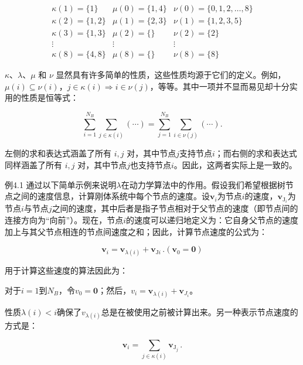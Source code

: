 \documentclass[10pt,a4paper]{book}
\theoremstyle{thmstyle} %
\theoremstyle{defstyle} %
\theoremstyle{prostyle} %
\begin{document}
$$
\begin{array}{lll}\kappa(1)=\{1\}&\mu(0)=\{1,4\}&\nu(0)=\{0,1,2,\dots,8\}\\\kappa(2)=\{1,2\}&\mu(1)=\{2,3\}&\nu(1)=\{1,2,3,5\}\\\kappa(3)=\{1,3\}&\mu(2)=\{\}&\nu(2)=\{2\}\\\vdots&\vdots&\vdots\\\kappa(8)=\{4,8\}&\mu(8)=\{\}&\nu(8)=\{8\}\end{array}
$$



$\kappa$、$\lambda$、$\mu$ 和 $\nu$ 显然具有许多简单的性质，这些性质均源于它们的定义。例如，$\mu(i) \subseteq \nu(i)$，$j \in \kappa(i) \Rightarrow i \in \nu(j)$，等等。其中一项并不显而易见却十分实用的性质是恒等式：



$$
\sum _ { i = 1 } ^{N _ { B} } \sum _ { j \in \kappa ( i ) } ( \cdots ) = \sum _ { j = 1 } ^{N _ { B} } \sum _ { i \in \nu ( j ) } ( \cdots ) .
$$



左侧的求和表达式涵盖了所有 $i,j$ 对，其中节点$j$支持节点$i$；而右侧的求和表达式同样涵盖了所有 $i,j$ 对，其中节点$j$也支持节点$i$。因此，这两者实际上是一致的。



例4.1 通过以下简单示例来说明$\lambda$在动力学算法中的作用。假设我们希望根据树节点之间的速度信息，计算刚体系统中每个节点的速度。设$\boldsymbol{v}_{i}$为节点$i$的速度，$\boldsymbol{v}_{\mathrm{J}_{i}}$为节点$i$与节点$j$之间的速度，其中后者是指子节点相对于父节点的速度（即节点间的连接方向为“向前”）。现在，节点$i$的速度可以递归地定义为：它自身父节点的速度加上与其父节点相连的节点间速度之和；因此，计算节点速度的公式为：



$$
\boldsymbol{ v } _ { i } = \boldsymbol{ v } _ { \lambda ( i ) } + \boldsymbol{ v } _ { \mathrm { J } i } \, .  ( \boldsymbol{ v } _ { 0 } = \boldsymbol{ 0 } )
$$



用于计算这些速度的算法因此为：



对于$i=1$到$N_{B}$，令$v_{0}=\mathbf{0}$；然后，$v_{i}=\boldsymbol{v}_{\lambda(i)}+\boldsymbol{v}_{J_{i}}$。



性质$\lambda(i) < i$确保了$v_{\lambda(i)}$总是在被使用之前被计算出来。另一种表示节点速度的方式是：



$$
{ \boldsymbol { v } } _ { i } = \sum _ { j \in \kappa ( i ) } { \boldsymbol { v } } _ { \mathrm { J } _ { j } } \, .
$$
\end{document}
